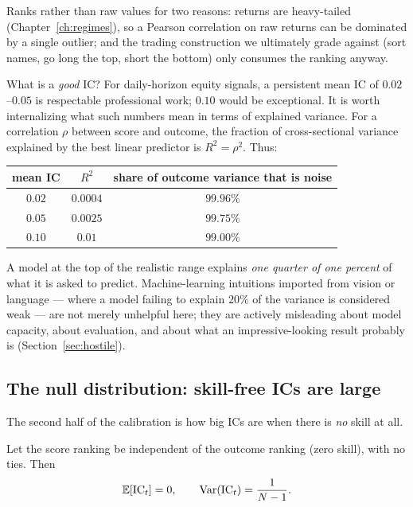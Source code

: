 Ranks rather than raw values for two reasons: returns are heavy-tailed
(Chapter~\ref{ch:regimes}), so a Pearson correlation on raw returns can be
dominated by a single outlier; and the trading construction we ultimately
grade against (sort names, go long the top, short the bottom) only consumes
the ranking anyway.

What is a \emph{good} IC? For daily-horizon equity signals, a persistent mean
IC of $0.02$--$0.05$ is respectable professional work; $0.10$ would be
exceptional. It is worth internalizing what such numbers mean in terms of
explained variance. For a correlation $\rho$ between score and outcome, the
fraction of cross-sectional variance explained by the best linear predictor
is $R^2 = \rho^2$. Thus:

\begin{center}
\small
\begin{tabular}{@{}ccc@{}}
\toprule
mean IC & $R^2$ & share of outcome variance that is noise \\
\midrule
$0.02$ & $0.0004$ & $99.96\%$ \\
$0.05$ & $0.0025$ & $99.75\%$ \\
$0.10$ & $0.01$   & $99.00\%$ \\
\bottomrule
\end{tabular}
\end{center}

A model at the top of the realistic range explains \emph{one quarter of one
percent} of what it is asked to predict. Machine-learning intuitions imported
from vision or language --- where a model failing to explain $20\%$ of the
variance is considered weak --- are not merely unhelpful here; they are
actively misleading about model capacity, about evaluation, and about what an
impressive-looking result probably is (Section~\ref{sec:hostile}).

\subsection{The null distribution: skill-free ICs are large}

The second half of the calibration is how big ICs are when there is
\emph{no} skill at all.

\begin{proposition}\label{prop:nullic}
Let the score ranking be independent of the outcome ranking (zero skill),
with no ties. Then
\[
  \mathbb{E}[\mathrm{IC}_t] = 0, \qquad \operatorname{Var}(\mathrm{IC}_t) = \frac{1}{N-1}.
\]
\end{proposition}

